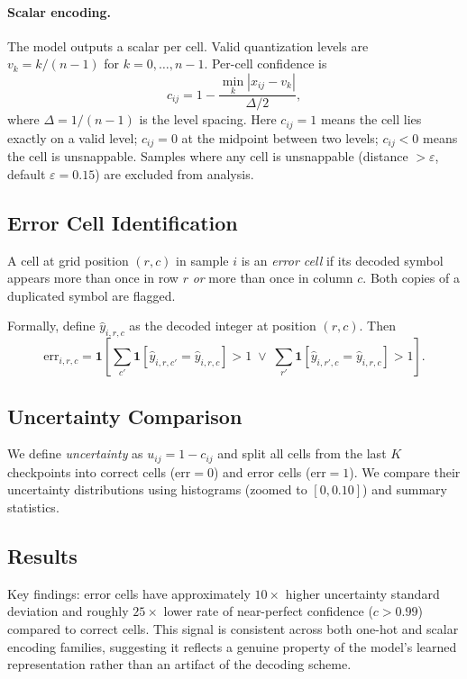 \paragraph{Scalar encoding.}
The model outputs a scalar per cell.
Valid quantization levels are $v_k = k/(n-1)$ for $k=0,\ldots,n-1$.
Per-cell confidence is
\begin{equation}
  c_{ij} = 1 - \frac{\min_k |x_{ij} - v_k|}{\Delta/2},
  \label{eq:scalar_conf}
\end{equation}
where $\Delta = 1/(n-1)$ is the level spacing.
Here $c_{ij}=1$ means the cell lies exactly on a valid level; $c_{ij}=0$ at the
midpoint between two levels; $c_{ij}<0$ means the cell is unsnappable.
Samples where any cell is unsnappable (distance $> \varepsilon$, default $\varepsilon=0.15$)
are excluded from analysis.

\subsection{Error Cell Identification}

A cell at grid position $(r,c)$ in sample $i$ is an \emph{error cell} if its decoded
symbol appears more than once in row $r$ \emph{or} more than once in column $c$.
Both copies of a duplicated symbol are flagged.

Formally, define $\hat{y}_{i,r,c}$ as the decoded integer at position $(r,c)$.
Then
\begin{equation}
  \text{err}_{i,r,c} = \mathbf{1}\!\left[
    \sum_{c'} \mathbf{1}[\hat{y}_{i,r,c'} = \hat{y}_{i,r,c}] > 1
    \;\vee\;
    \sum_{r'} \mathbf{1}[\hat{y}_{i,r',c} = \hat{y}_{i,r,c}] > 1
  \right].
\end{equation}

\subsection{Uncertainty Comparison}

We define \emph{uncertainty} as $u_{ij} = 1 - c_{ij}$ and split all cells from the
last $K$ checkpoints into correct cells ($\text{err}=0$) and error cells
($\text{err}=1$). We compare their uncertainty distributions
using histograms (zoomed to $[0, 0.10]$) and summary statistics.

\subsection{Results}



Key findings: error cells have approximately $10\times$ higher uncertainty standard
deviation and roughly $25\times$ lower rate of near-perfect confidence ($c > 0.99$)
compared to correct cells.
This signal is consistent across both one-hot and scalar encoding families,
suggesting it reflects a genuine property of the model's learned representation
rather than an artifact of the decoding scheme.
